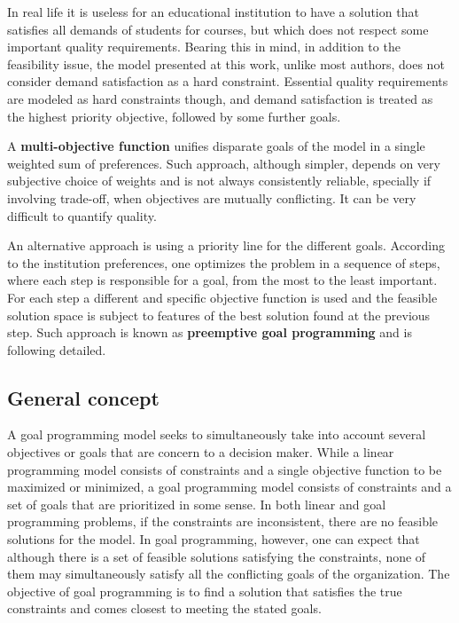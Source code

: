 In real life it is useless for an educational institution to have a solution that satisfies all demands of students for courses, but which does not respect some important quality requirements. Bearing this in mind, in addition to the feasibility issue, the model presented at this work, unlike most authors, does not consider demand satisfaction as a hard constraint. Essential quality requirements are modeled as hard constraints though, and demand satisfaction is treated as the highest priority objective, followed by some further goals.

A \textbf{multi-objective function} unifies disparate goals of the model in a single weighted sum of preferences. Such approach, although simpler, depends on very subjective choice of weights and is not always consistently reliable, specially if involving trade-off, when objectives are mutually conflicting. It can be very difficult to quantify quality.

An alternative approach is using a priority line for the different goals. According to the institution preferences, one optimizes the problem in a sequence of steps, where each step is responsible for a goal, from the most to the least important. For each step a different and specific objective function is used and the feasible solution space is subject to features of the best solution found at the previous step. Such approach is known as \textbf{preemptive goal programming} and is following detailed.


\subsection{General concept}

A goal programming model seeks to simultaneously take into account several objectives or goals that are concern to a decision maker. While a linear programming model consists of constraints and a single objective function to be maximized or minimized, a goal programming model consists of constraints and a set of goals that are prioritized in some sense.
In both linear and goal programming problems, if the constraints are inconsistent, there are no feasible solutions for the model. In goal programming, however, one can expect that although there is a set of feasible solutions satisfying the constraints, none of them may simultaneously satisfy all the conflicting goals of the organization. The objective of goal programming is to find a solution that satisfies the true constraints and comes closest to meeting the stated goals.

